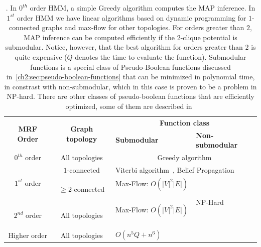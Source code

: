 \begin{table}
\center
\scriptsize
\begin{tabular}{|c|c|m{14em}|m{10em}|}
\hline
\multirow{2}{*}{\textbf{MRF Order}} & \multirow{2}{*}{\textbf{Graph topology}} & \multicolumn{2}{c|}{\textbf{Function class}} \\
\cline{3-4}
&   & \textbf{Submodular} & \textbf{Non-submodular} \\
\hline
$0^{th}$ order & All topologies & \multicolumn{2}{c|}{Greedy algorithm} \\
\hline
\multirow{2}{*}{$1^{st}$ order} & $1$-connected & \multicolumn{2}{m{24em}|}{Viterbi algorithm~\cite{viterbi67}, Belief Propagation~\cite{pearl82}} \\
\cline{2-4}
& $\geq 2$-connected & Max-Flow: $\scriptstyle O(|V|^2|E|)$~\cite{kolmogorov04whatenergies} & \multirow{2}{=}[-2mm]{NP-Hard~\cite{nemhauser81}} \\
\cline{1-3}
$2^{nd}$ order & All topologies & Max-Flow: $\scriptstyle O(|V|^2|E|)$~\cite{billionnet85} & \\
\cline{1-3}
Higher order & All topologies & $O(n^5Q + n^6)$~\cite{orlin09faster} & \\
\hline
\end{tabular}
\caption{. In $0^{th}$ order HMM, a simple Greedy algorithm computes the MAP inference. In $1^{st}$ order HMM we have linear algorithms based on dynamic programming for $1$-connected graphs and max-flow for other topologies. For orders greater than $2$, MAP inference can be computed efficiently if the $2$-clique potential is submodular. Notice, however, that the best algorithm for orders greater than $2$ is quite expensive ($Q$ denotes the time to evaluate the function). Submodular functions is a special class of Pseudo-Boolean functions discussed in~\cref{ch2:sec:pseudo-boolean-functions} that can be minimized in polynomial time, in constrast with non-submodular, which in this case is proven to be a problem in NP-hard. There are other classes of pseudo-boolean functions that are efficiently optimized, some of them are described in~\cite{boros02pseudo}   }
\label{ch2:tab:map-inference-binary-mrf}
\end{table}



